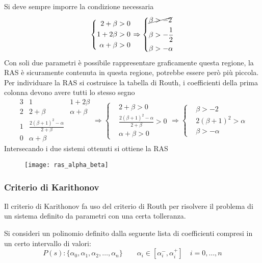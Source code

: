 Si deve sempre imporre la condizione necessaria
$$\left\{\begin{aligned}
2+\beta &> 0 \\
1+2\beta &> 0 \\
\alpha+ \beta &> 0
\end{aligned}\right.\Rightarrow
\left\{\begin{aligned}
&\cancel{\beta  > -2}\\
&\beta  > -\frac{1}{2} \\
&\beta  > -\alpha
\end{aligned}\right.
$$
Con soli due parametri è possibile rappresentare graficamente questa regione,
la RAS è sicuramente contenuta in questa regione, potrebbe essere però più
piccola. Per individuare la RAS si costruisce la tabella di Routh, i
coefficienti della prima colonna devono avere tutti lo stesso segno
$$
\begin{array}{c|cc}
3 & 1 & 1+2\beta \\
2 & 2+\beta & \alpha + \beta \\ \hline
1 & \frac{2(\beta+1)^2-\alpha}{2+\beta}\\
0 & \alpha+\beta
\end{array}\Rightarrow\left\{
\begin{aligned}
&2+\beta > 0 \\
&\frac{2(\beta+1)^2-\alpha}{2+\beta} > 0\\
&\alpha + \beta > 0
\end{aligned}\right.\Rightarrow
\left\{\begin{aligned}
&\beta>-2\\
&2(\beta+1)^2 > \alpha\\
&\beta > -\alpha
\end{aligned}\right.
$$
Intersecando i due sistemi ottenuti si ottiene la RAS
\begin{figure}[h]
 \centering
 \texttt{[image: ras\_alpha\_beta]}
\end{figure}

\newpage
\subsubsection{Criterio di Karithonov}
Il criterio di Karithonov fa uso del criterio di Routh per risolvere il
problema di un sistema definito da parametri con una certa tolleranza.

Si consideri un polinomio definito dalla seguente lista di coefficienti
compresi in un certo intervallo di valori:
$$
P(s) : \{\alpha_0,\alpha_1,\alpha_2,\ldots,\alpha_n\} \qquad
\alpha_i\in[\alpha_i^-,\alpha_i^+]\quad i=0,\ldots,n
$$

